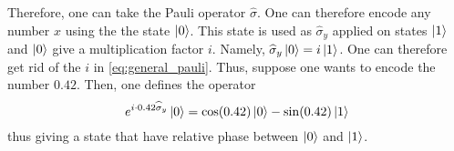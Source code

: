 Therefore, one can take the Pauli operator $\widehat{\sigma}$. One can therefore 
encode any number $x$ using the the state $\ket{0}$. This state is used as $\widehat{\sigma}_y$ applied on 
states $\ket{1}$ and $\ket{0}$ give a multiplication factor $i$. Namely, 
$\widehat{\sigma}_y \ket{0} = i\ket{1}$. One can therefore get rid of the $i$ in \autoref{eq:general_pauli}.
Thus, suppose one wants to encode the number $0.42$. Then, one defines the operator 
\begin{equation}
  e^{i\cdot 0.42\widehat{\sigma}_y}\ket{0} = \cos(0.42)\ket{0} -\sin(0.42)\ket{1}
\end{equation}
thus giving a state that have relative phase between $\ket{0}$ and $\ket{1}$.


  









